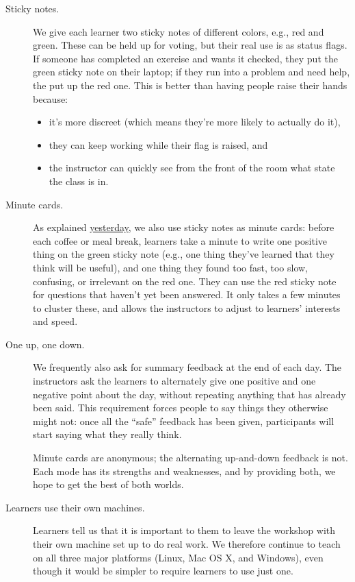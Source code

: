 \begin{description}
\item[Sticky notes.] We give each learner two sticky notes of different colors,
e.g., red and green.
These can be held up for voting,
but their real use is as status flags.
If someone has completed an exercise and wants it checked,
they put the green sticky note on their laptop;
if they run into a problem and need help,
the put up the red one.
This is better than having people raise their hands because:


\begin{itemize}
\item it's more discreet (which means they're more likely to actually do it),
\item they can keep working while their flag is raised, and
\item the instructor can quickly see from the front of the room
what state the class is in.
\end{itemize}


\item[Minute cards.] As explained \href{\{\{ page.root \}\}/06-summarize/}{yesterday}, we also
use sticky notes as minute cards: before each coffee or meal break,
learners take a minute to write one positive thing on the green
sticky note (e.g., one thing they've learned that they think will
be useful), and one thing they found too fast, too slow,
confusing, or irrelevant on the red one.  They can use the red
sticky note for questions that haven't yet been answered.  It only
takes a few minutes to cluster these, and allows the instructors
to adjust to learners' interests and speed.



\item[One up, one down.] We frequently also ask for summary feedback at the end of each day.
The instructors ask the learners to alternately give one positive and
one negative point about the day, without repeating anything that has
already been said.  This requirement forces people to say things they
otherwise might not: once all the ``safe'' feedback has been given,
participants will start saying what they really think.


Minute cards are anonymous; the alternating up-and-down feedback is
not.  Each mode has its strengths and weaknesses, and by providing
both, we hope to get the best of both worlds.



\item[Learners use their own machines.] Learners tell us that it is important to them to leave the workshop
with their own machine set up to do real work.  We therefore continue
to teach on all three major platforms (Linux, Mac OS X, and Windows),
even though it would be simpler to require learners to use just one.



\end{description}
